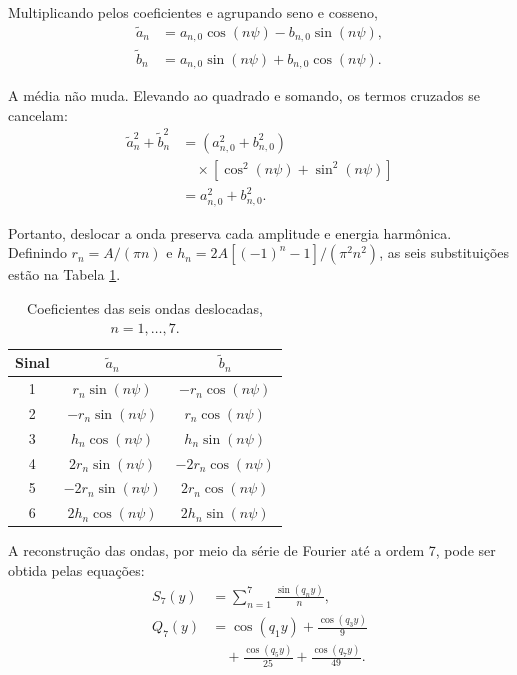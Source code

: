 Multiplicando pelos coeficientes e agrupando seno e cosseno,
\begin{equation}
    \begin{aligned}
        \widetilde a_n&=a_{n,0}\cos(n\psi)-b_{n,0}\sin(n\psi), \\
        \widetilde b_n&=a_{n,0}\sin(n\psi)+b_{n,0}\cos(n\psi).
    \end{aligned}
    \label{eq:rotacao_coeficientes}
\end{equation}

A média não muda. Elevando ao quadrado e somando, os termos cruzados
se cancelam:
\begin{equation}
    \begin{aligned}
        \widetilde a_n^2+\widetilde b_n^2
            &=(a_{n,0}^2+b_{n,0}^2) \\
            &\quad {}\times[\cos^2(n\psi)+\sin^2(n\psi)] \\
            &=a_{n,0}^2+b_{n,0}^2.
    \end{aligned}
\end{equation}

Portanto, deslocar a onda preserva cada amplitude e energia harmônica.
Definindo $r_n=A/(\pi n)$ e $h_n=2A[(-1)^n-1]/(\pi^2n^2)$,
as seis substituições estão na Tabela \ref{tab:deslocamentos}.
\begin{table}[H]
    \centering\footnotesize
    \caption{Coeficientes das seis ondas deslocadas, $n=1,\ldots,7$.}
    \label{tab:deslocamentos}
    \begin{tabular}{ccc}\hline
        Sinal & $\widetilde a_n$ & $\widetilde b_n$ \\\hline
        1 & $r_n\sin(n\psi)$ & $-r_n\cos(n\psi)$ \\
        2 & $-r_n\sin(n\psi)$ & $r_n\cos(n\psi)$ \\
        3 & $h_n\cos(n\psi)$ & $h_n\sin(n\psi)$ \\
        4 & $2r_n\sin(n\psi)$ & $-2r_n\cos(n\psi)$ \\
        5 & $-2r_n\sin(n\psi)$ & $2r_n\cos(n\psi)$ \\
        6 & $2h_n\cos(n\psi)$ & $2h_n\sin(n\psi)$ \\\hline
    \end{tabular}
\end{table}

A reconstrução das ondas, por meio da série de Fourier até a ordem 7, pode ser obtida pelas equações:
\begin{equation}
    \begin{aligned}
        S_7(y)&=\sum_{n=1}^{7}\frac{\sin(q_ny)}{n}, \\
        Q_7(y)&=\cos(q_1y)+\frac{\cos(q_3y)}{9} \\
            &\quad {}+\frac{\cos(q_5y)}{25}+\frac{\cos(q_7y)}{49}.
    \end{aligned}
\end{equation}

